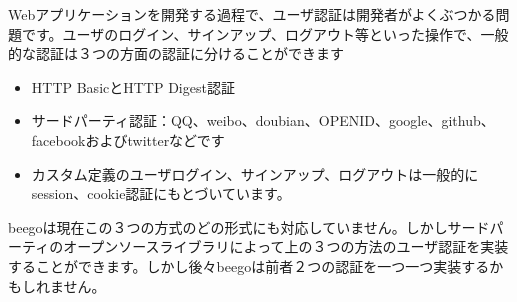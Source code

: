 Webアプリケーションを開発する過程で、ユーザ認証は開発者がよくぶつかる問題です。ユーザのログイン、サインアップ、ログアウト等といった操作で、一般的な認証は３つの方面の認証に分けることができます

\begin{itemize}
  \item HTTP BasicとHTTP Digest認証
  \item サードパーティ認証：QQ、weibo、doubian、OPENID、google、github、facebookおよびtwitterなどです
  \item カスタム定義のユーザログイン、サインアップ、ログアウトは一般的にsession、cookie認証にもとづいています。
\end{itemize}

beegoは現在この３つの方式のどの形式にも対応していません。しかしサードパーティのオープンソースライブラリによって上の３つの方法のユーザ認証を実装することができます。しかし後々beegoは前者２つの認証を一つ一つ実装するかもしれません。
